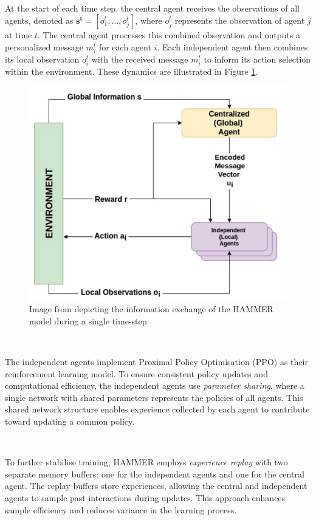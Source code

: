 \documentclass{article}
\begin{document}
\

At the start of each time step, the central agent receives the observations of all agents, denoted as $\mathbf{s^t} = [o_1^t, \hdots, o_j^t]$, where $o_j^t$ represents the observation of agent $j$ at time $t$. The central agent processes this combined observation and outputs a personalized message $m_i^t$ for each agent $i$. Each independent agent then combines its local observation $o_i^t$ with the received message $m_i^t$ to inform its action selection within the environment. These dynamics are illustrated in Figure \ref{fig:hammer}.

\begin{figure}
	\centering
	\includegraphics[scale=0.5]{images/hammer}
	\caption{Image from \citet{gupta2022HAMMER} depicting the information exchange of the HAMMER model during a single time-step.}
	\label{fig:hammer}
\end{figure}

\

The independent agents implement Proximal Policy Optimisation (PPO) \citep{schulman2017proximal} as their reinforcement learning model. To ensure consistent policy updates and computational efficiency, the independent agents use \textit{parameter sharing}, where a single network with shared parameters represents the policies of all agents. This shared network structure enables experience collected by each agent to contribute toward updating a common policy.

\

To further stabilise training, HAMMER employs \textit{experience replay} with two separate memory buffers: one for the independent agents and one for the central agent. The replay buffers store experiences, allowing the central and independent agents to sample past interactions during updates. This approach enhances sample efficiency and reduces variance in the learning process.
\end{document}
